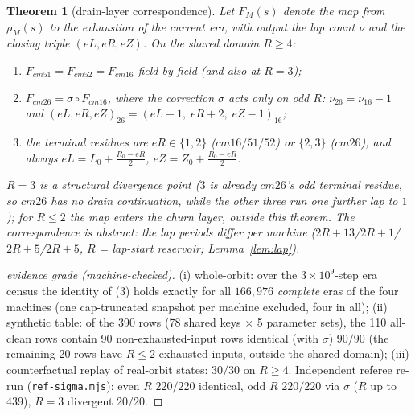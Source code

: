 \documentclass[11pt]{amsart}
\newtheorem{theorem}{Theorem}[section]
\begin{document}
\begin{theorem}[drain-layer correspondence]\label{thm:drain}
Let $F_M(s)$ denote the map from $\rho_M(s)$ to the exhaustion of the current era, with output the lap count $\nu$ and the closing triple $(eL,eR,eZ)$. On the shared domain $R\ge4$:
\begin{enumerate}
\item $F_{cm51}=F_{cm52}=F_{cm16}$ field-by-field (and also at $R=3$);
\item $F_{cm26}=\sigma\circ F_{cm16}$, where the correction $\sigma$ acts only on odd $R$: $\nu_{26}=\nu_{16}-1$ and $(eL,eR,eZ)_{26}=(eL-1,\;eR+2,\;eZ-1)_{16}$;
\item the terminal residues are $eR\in\{1,2\}$ ($cm16/51/52$) or $\{2,3\}$ ($cm26$), and always $eL=L_0+\tfrac{R_0-eR}{2}$, $eZ=Z_0+\tfrac{R_0-eR}{2}$.
\end{enumerate}
$R=3$ is a structural divergence point ($3$ is already $cm26$'s odd terminal residue, so $cm26$ has no drain continuation, while the other three run one further lap to $1$); for $R\le2$ the map enters the churn layer, outside this theorem. The correspondence is abstract: the lap periods differ per machine ($2R{+}13$/$2R{+}1$/$2R{+}5$/$2R{+}5$, $R$ = lap-start reservoir; Lemma~\ref{lem:lap}).
\end{theorem}
\begin{proof}[evidence grade (machine-checked)]
(i) whole-orbit: over the $3\times10^9$-step era census the identity of (3) holds exactly for all $166{,}976$ \emph{complete} eras of the four machines (one cap-truncated snapshot per machine excluded, four in all); (ii) synthetic table: of the 390 rows (78 shared keys $\times$ 5 parameter sets), the 110 all-clean rows contain 90 non-exhausted-input rows identical (with $\sigma$) $90/90$ (the remaining 20 rows have $R\le2$ exhausted inputs, outside the shared domain); (iii) counterfactual replay of real-orbit states: $30/30$ on $R\ge4$. Independent referee re-run (\texttt{ref-sigma.mjs}): even $R$ $220/220$ identical, odd $R$ $220/220$ via $\sigma$ ($R$ up to 439), $R=3$ divergent $20/20$.
\end{proof}
\end{document}
